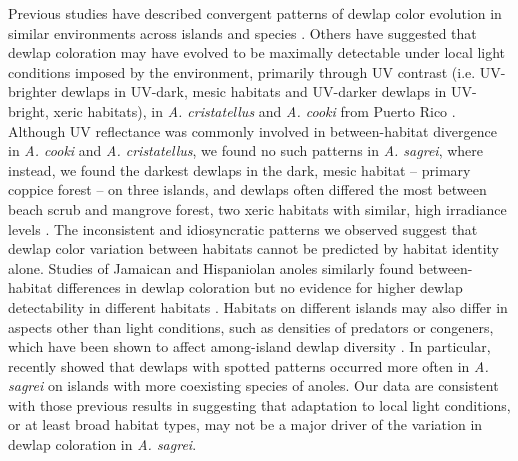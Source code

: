 Previous studies have described convergent patterns of dewlap color evolution in similar environments across islands and species \citep{Thorpe2002a, Thorpe2002b}. Others have suggested that dewlap coloration may have evolved to be maximally detectable under local light conditions imposed by the environment, primarily through UV contrast (i.e. UV-brighter dewlaps in UV-dark, mesic habitats and UV-darker dewlaps in UV-bright, xeric habitats), in \textit{A. cristatellus} and \textit{A. cooki} from Puerto Rico \citep{Leal2002, Leal2004}. Although UV reflectance was commonly involved in between-habitat divergence in \textit{A. cooki} and \textit{A. cristatellus}, we found no such patterns in \textit{A. sagrei}, where instead, we found the darkest dewlaps in the dark, mesic habitat -- primary coppice forest -- on three islands, and dewlaps often differed the most between beach scrub and mangrove forest, two xeric habitats with similar, high irradiance levels \citep{Howard1950, Schoener1968}. The inconsistent and idiosyncratic patterns we observed suggest that dewlap color variation between habitats cannot be predicted by habitat identity alone. Studies of Jamaican and Hispaniolan anoles similarly found between-habitat differences in dewlap coloration but no evidence for higher dewlap detectability in different habitats \citep{Fleishman2009, Ng2012}. Habitats on different islands may also differ in aspects other than light conditions, such as densities of predators or congeners, which have been shown to affect among-island dewlap diversity \citep{Vanhooydonck2009, Baeckens2018}. In particular, \citet{Baeckens2018} recently showed that dewlaps with spotted patterns occurred more often in \textit{A. sagrei} on islands with more coexisting species of anoles. Our data are consistent with those previous results in suggesting that adaptation to local light conditions, or at least broad habitat types, may not be a major driver of the variation in dewlap coloration in \textit{A. sagrei}.\\


